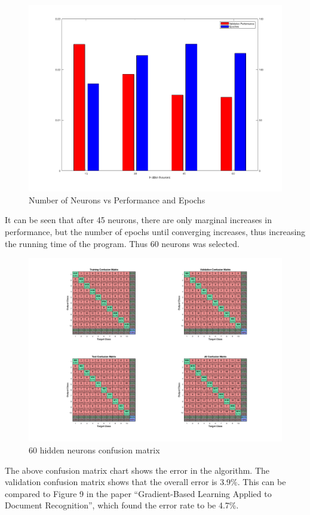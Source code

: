 \begin{figure}[H]
    \includegraphics[width=\linewidth]{../../pracs/week7/images/neurons_plot}
    \centering
    \caption{Number of Neurons vs Performance and Epochs}
\end{figure}

It can be seen that after 45 neurons, there are only marginal increases in performance, but the number of epochs until converging increases, thus increasing the running time of the program.
Thus 60 neurons was selected.

\begin{figure}[H]
    \includegraphics[width=\linewidth]{../../pracs/week7/images/60_hidden_neurons_confusion}
    \centering
    \caption{60 hidden neurons confusion matrix}
\end{figure}

The above confusion matrix chart shows the error in the algorithm.
The validation confusion matrix shows that the overall error is 3.9\%.
This can be compared to Figure 9 in the paper ``Gradient-Based Learning Applied to Document Recognition'', which found the error rate to be 4.7\%. 


